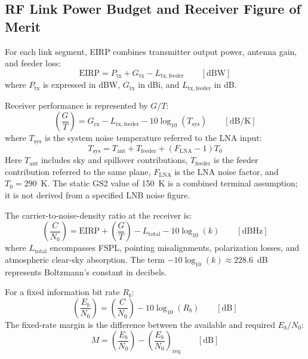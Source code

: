 \subsection{RF Link Power Budget and Receiver Figure of Merit}
For each link segment, EIRP combines transmitter output power, antenna gain, and feeder loss:
\begin{equation}
    \mathrm{EIRP}
    =
    P_{\mathrm{tx}}
    +
    G_{\mathrm{tx}}
    -
    L_{\mathrm{tx,feeder}}
    \qquad [\mathrm{dBW}]
\end{equation}
where $P_{\mathrm{tx}}$ is expressed in dBW, $G_{\mathrm{tx}}$ in dBi, and $L_{\mathrm{tx,feeder}}$ in dB.

Receiver performance is represented by $G/T$:
\begin{equation}
    \left(\frac{G}{T}\right)
    =
    G_{\mathrm{rx}}
    -
    L_{\mathrm{rx,feeder}}
    -
    10\log_{10}\left(T_{\mathrm{sys}}\right)
    \qquad [\mathrm{dB/K}]
\end{equation}
where $T_{\mathrm{sys}}$ is the system noise temperature referred to the LNA input:
\begin{equation}
    T_{\mathrm{sys}} = T_{\mathrm{ant}} + T_{\mathrm{feeder}} + (F_{\mathrm{LNA}} - 1)T_0
\end{equation}
Here $T_{\mathrm{ant}}$ includes sky and spillover contributions, $T_{\mathrm{feeder}}$ is the feeder contribution referred to the same plane, $F_{\mathrm{LNA}}$ is the LNA noise factor, and $T_0 = 290$~K. The static GS2 value of 150~K is a combined terminal assumption; it is not derived from a specified LNB noise figure.

The carrier-to-noise-density ratio at the receiver is:
\begin{equation}
    \left(\frac{C}{N_0}\right)
    =
    \mathrm{EIRP}
    +
    \left(\frac{G}{T}\right)
    -
    L_{\mathrm{total}}
    -
    10\log_{10}(k)
    \qquad [\mathrm{dBHz}]
\end{equation}
where $L_{\mathrm{total}}$ encompasses FSPL, pointing misalignments, polarization losses, and atmospheric clear-sky absorption. The term $-10\log_{10}(k) \approx 228.6$~dB represents Boltzmann's constant in decibels.

For a fixed information bit rate $R_b$:
\begin{equation}
    \left(\frac{E_b}{N_0}\right)
    =
    \left(\frac{C}{N_0}\right)
    -
    10\log_{10}(R_b)
    \qquad [\mathrm{dB}]
\end{equation}
The fixed-rate margin is the difference between the available and required $E_b/N_0$:
\begin{equation}
    M
    =
    \left(\frac{E_b}{N_0}\right)
    -
    \left(\frac{E_b}{N_0}\right)_{\mathrm{req}}
    \qquad [\mathrm{dB}]
\end{equation}

